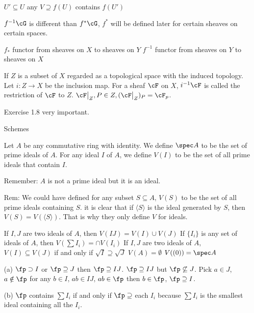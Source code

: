 $U' \subseteq U$ any $V \supseteq f(U)$ contains $f(U')$

$f^{-1} \cG$ is different than $f^*\cG$, $f^*$ will be defined later for certain sheaves on certain spaces. 






$f_*$ functor from sheaves on $X$ to sheaves on $Y$
$f^{-1}$ functor from sheaves on $Y$ to sheaves on $X$


\begin{dfn}
If $Z$ is a subset of $X$ regarded as a topological space with the induced topology. Let $i: Z \to X$ be the inclusion map. For a sheaf $\cF$ on $X$, $i^{-1}\cF$ is called the restriction of $\cF$ to $Z$.
$\cF\big|_Z, P \in Z, (\cF\big|_Z)_P= \cF_p$.
\end{dfn}



Exercise 1.8 very important. 




Schemes

\begin{dfn}
Let $A$ be any commutative ring with identity. We define $\spec A$ to be the set of prime ideals of $A$. For any ideal $I$ of $A$, we define $V(I)$ to be the set of all prime ideals that contain $I$.
\end{dfn}

Remember: $A$ is not a prime ideal but it is an ideal.


Rem: We could have defined for any subset $S \subseteq A$, $V(S)$ to be the set of all prime ideals containing $S$. it is clear that if $\langle S \rangle$ is the ideal generated by $S$, then $V(S)= V(\langle S \rangle)$. That is why they only define $V$ for ideals.


\begin{lem}
If $I, J$ are two ideals of $A$, then $V(IJ)= V(I)  \cup V(J)$
If $\{I_i\}$ is any set of ideals of $A$, then $V(\sum I_i)= \cap V(I_i)$
If $I,J$ are two ideals of $A$, $V(I) \subseteq V(J)$ if and only if $\sqrt{I} \supseteq \sqrt{J}$
$V(A)= \emptyset$
$V((0))= \spec A$
\end{lem}

\pf 

(a) $\fp \supset I$ or $\fp \supseteq J$ then $\fp \supseteq IJ$. $\fp \supseteq IJ$ but $\fp \not\subseteq J$. Pick $a \in J$, $a \notin \fp$ for any $b \in I$, $ab \in IJ$, $ab \in \fp$ then $b \in \fp$, $\fp \supseteq I$.

(b) $\fp$ contains $\sum I_i$ if and only if $\fp \supseteq$ each $I_i$ because $\sum I_i$ is the smallest ideal containing all the $I_i$.

